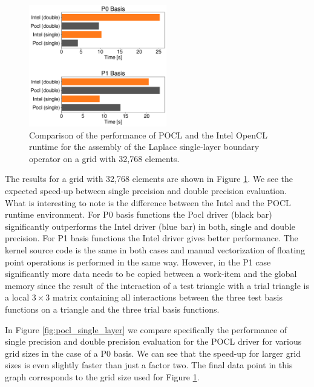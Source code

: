 \begin{figure}
	\center
	\includegraphics[width=6cm]{img/intel_pocl_laplace_comp}
	\caption{Comparison of the performance of POCL and the Intel OpenCL runtime for the assembly of the Laplace single-layer boundary operator on a grid with 32,768 elements.}
	\label{fig:intel_pocl_laplace_cmp}
\end{figure}

The results for a grid with 32,768 elements are shown in Figure \ref{fig:intel_pocl_laplace_cmp}. We see the expected speed-up between single precision and double precision evaluation. What is interesting to note is the difference between the Intel and the POCL runtime environment. For P0 basis functions the Pocl driver (black bar) significantly outperforms the Intel driver (blue bar) in both, single and double precision. For P1 basis functions the Intel driver gives better performance. The kernel source code is the same in both cases and manual vectorization of floating point operations is performed in the same way. However, in the P1 case significantly more data needs to be copied between a work-item and the global memory since the result of the interaction of a test triangle with a trial triangle is a local $3\times 3$ matrix containing all interactions between the three test basis functions on a triangle and the three trial basis functions. 

In Figure \ref{fig:pocl_single_layer} we compare specifically the performance of single precision and double precision evaluation for the POCL driver for various grid sizes in the case of a P0 basis. We can see that the speed-up for larger grid sizes is even slightly faster than just a factor two. The final data point in this graph corresponds to the grid size used for Figure \ref{fig:intel_pocl_laplace_cmp}.


